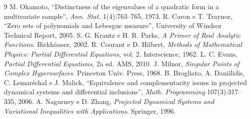 \documentclass[11pt,a4paper]{article}
\begin{document}
\begin{thebibliography}{9}
 M. Okamoto, ``Distinctness of the eigenvalues of a quadratic form in a multivariate sample'', \emph{Ann. Stat.} 1(4):763--765, 1973.
 R. Caron e T. Traynor, ``Zero sets of polynomials and Lebesgue measure'', University of Windsor Technical Report, 2005.
 S. G. Krantz e H. R. Parks, \emph{A Primer of Real Analytic Functions}. Birkhäuser, 2002.
 R. Courant e D. Hilbert, \emph{Methods of Mathematical Physics: Partial Differential Equations}, vol. 2. Interscience, 1962.
 L. C. Evans, \emph{Partial Differential Equations}, 2a ed. AMS, 2010.
 J. Milnor, \emph{Singular Points of Complex Hypersurfaces}. Princeton Univ. Press, 1968.
 B. Brogliato, A. Daniilidis, C. Lemaréchal e J. Malick, ``Equivalence and complementarity issues in projected dynamical systems and differential inclusions'', \emph{Math. Programming} 107(3):317--335, 2006.
 A. Nagurney e D. Zhang, \emph{Projected Dynamical Systems and Variational Inequalities with Applications}. Springer, 1996.
\end{thebibliography}
\end{document}
